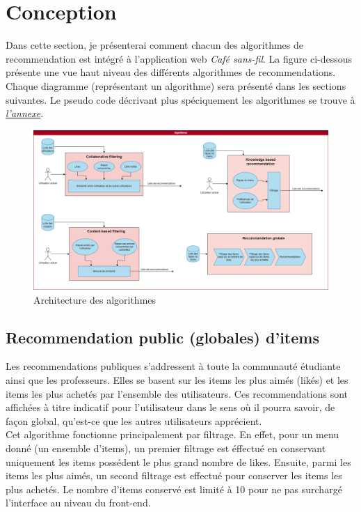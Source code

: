 \documentclass[11pt]{article}
\begin{document}
\section{Conception}
Dans cette section, je présenterai comment chacun des algorithmes de recommendation est intégré à l'application web \textit{Café sans-fil}. La figure ci-dessous présente une vue haut niveau des différents algorithmes de recommendations. Chaque diagramme (représentant un algorithme) sera présenté dans les sections suivantes. Le pseudo code décrivant plus spéciquement les algorithmes se trouve à \hyperref[annexe]{\textit{l'annexe}}.
\begin{figure}[h]
%
\includegraphics[scale=0.3]{Pipeline.drawio.png} 
\caption{Architecture des algorithmes}
\end{figure}

\subsection{Recommendation public (globales) d'items}
Les recommendations publiques s'addressent à toute la communauté étudiante ainsi que les professeurs. Elles se basent sur les items les plus aimés (likés) et les items les plus achetés par l'ensemble des utilisateurs. Ces recommendations sont affichées à titre indicatif pour l'utilisateur dans le sens où il pourra savoir, de façon global, qu'est-ce que les autres utilisateurs apprécient.\\

Cet algorithme fonctionne principalement par filtrage. En effet, pour un menu donné (un ensemble d'items), un premier filtrage est éffectué en conservant uniquement les items possédent le plus grand nombre de likes. Ensuite, parmi les items les plus aimés, un second filtrage est effectué pour conserver les items les plus achetés. Le nombre d'items conservé est limité à 10 pour ne pas surchargé l'interface au niveau du front-end.
\end{document}
